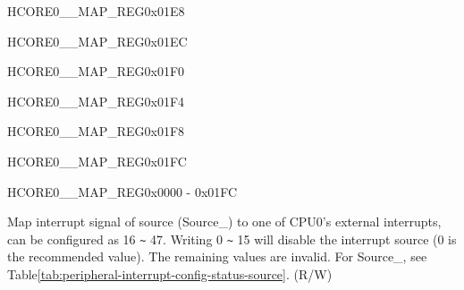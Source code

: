 \begin{register}{H}{CORE0\_\_MAP\_REG}{0x01E8}\label{regdesc:CORE0H264DMA2DINCH2INTMAPREG}
\end{register}\vspace{-3em}


\begin{register}{H}{CORE0\_\_MAP\_REG}{0x01EC}\label{regdesc:CORE0H264DMA2DINCH3INTMAPREG}
\end{register}\vspace{-3em}


\begin{register}{H}{CORE0\_\_MAP\_REG}{0x01F0}\label{regdesc:CORE0H264DMA2DINCH4INTMAPREG}
\end{register}\vspace{-3em}


\begin{register}{H}{CORE0\_\_MAP\_REG}{0x01F4}\label{regdesc:CORE0H264DMA2DINCH5INTMAPREG}
\end{register}\vspace{-3em}


\begin{register}{H}{CORE0\_\_MAP\_REG}{0x01F8}\label{regdesc:CORE0H264REGINTMAPREG}
\end{register}\vspace{-3em}


\begin{register}{H}{CORE0\_\_MAP\_REG}{0x01FC}\label{regdesc:CORE0ASSISTDEBUGINTMAPREG}
\end{register}\vspace{-3em}

\begin{register}{H}{CORE0\_\_MAP\_REG}{0x0000 - 0x01FC}\label{regdesc:CORE0SOURCEregindexYMAPREG}
%
%
\regnewline%
\begin{regdesc}\begin{reglist}
\label{fielddesc:CORE0SOURCEregindexYMAP}\item [CORE0\_SOURCE\_\regindex{Y}\_MAP] Map interrupt signal of source (Source\_) to one of CPU0's external interrupts, can be configured as 16 \verb+~+ 47. Writing 0 \verb+~+ 15 will disable the interrupt source (0 is the recommended value). The remaining values are invalid. For Source\_, see Table\ref{tab:peripheral-interrupt-config-status-source}.  (R/W)
\end{reglist}\end{regdesc}
\end{register}


